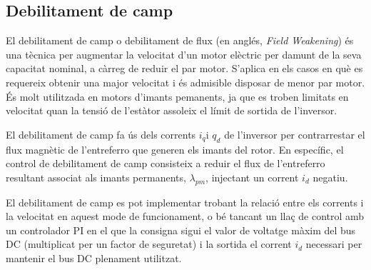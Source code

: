 {    %
}

\subsection{ Debilitament de camp }
{
    El debilitament de camp o debilitament de flux (en anglés, \emph{Field
    Weakening}) és una tècnica per augmentar la velocitat d'un motor elèctric
    per damunt de la seva capacitat nominal, a càrreg de reduir el par motor.
    S'aplica en els casos en què es requereix obtenir una major velocitat i és
    admisible disposar de menor par motor. És molt utilitzada en motors
    d'imants pemanents, ja que es troben limitats en velocitat quan la tensió
    de l'estàtor assoleix el límit de sortida de l'inversor.

    El debilitament de camp fa ús dels corrents $i_q$i $q_d$ de l'inversor per
    contrarrestar el flux magnètic de l'entreferro que generen els imants del
    rotor. En específic, el control de debilitament de camp consisteix a reduir
    el flux de l'entreferro resultant associat als imants permanents,
    $\lambda_{pm}$, injectant un corrent $i_d$ negatiu.

    El debilitament de camp es pot implementar trobant la relació entre els
    corrents i la velocitat en aquest mode de funcionament, o bé tancant un
    llaç de control amb un controlador PI en el que la consigna sigui
    el valor de voltatge màxim del bus DC (multiplicat per un factor de
    seguretat) i la sortida el corrent $i_d$ necessari per mantenir el bus DC
    plenament utilitzat.
}

